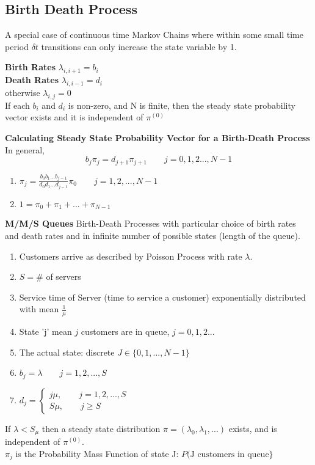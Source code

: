 \documentclass[10pt,a4paper]{article}
\begin{document}
\subsection{Birth Death Process}
A special case of continuous time Markov Chains where within some small time period $\delta t$ transitions can only increase the state variable by 1.
\begin{framed}
	\centering\textbf{Birth Rates}
	$\lambda_{i,i+1}=b_{i}$\\
	\centering\textbf{Death Rates}
	$\lambda_{i,i-1}=d_{i}$ \\
	otherwise $\lambda_{i,j} = 0$ \\
	If each $b_{i}$ and $d_{i}$ is non-zero, and N is finite, then the steady state probability vector exists and it is independent of $\pi^{(0)}$
	\end{framed}
	\newpage 
	\begin{framed}
		\centering\textbf{Calculating Steady State Probability Vector for a Birth-Death Process} \\ In general, 
		$$b_{j}\pi_{j} = d_{j+1}\pi_{j+1} \qquad j=0,1,2...,N-1$$ 
		\begin{enumerate}
		\item $\pi_{j} = \frac{b_{0}b_{1}...b_{j-1}}{d_{0}d_{1}...d_{j-1}}\pi_{0} \qquad j=1,2,...,N-1$
		\item $1 = \pi_{0} + \pi_{1} + ... + \pi_{N-1}$ 
		\end{enumerate}
\end{framed}
\begin{framed}
	\centering\textbf{M/M/S Queues}
	Birth-Death Processes with particular choice of birth rates and death rates and in infinite number of possible states (length of the queue).
	\begin{enumerate}
	\item Customers arrive as described by Poisson Process with rate $\lambda$.
	\item $S = \#$ of servers
	\item Service time of Server (time to service a customer) exponentially distributed with mean $\frac{1}{\mu}$
	\item State 'j' mean $j$ customers are in queue, $j = 0,1,2...$
	\item The actual state: discrete $J \in \{0,1,...,N-1\}$
	\item $b_{j}= \lambda \qquad j = 1,2,...,S$
	\item $d_{j} = \begin{cases}
	j\mu, \qquad j=1,2,...,S \\
	S\mu, \qquad j \geq S
	\end{cases}$
	\end{enumerate}
	If $\lambda < S_{\mu}$ then a steady state distribution $\pi = (\lambda_{0},\lambda_{1},...)$ exists, and is independent of $\pi^{(0)}$. \\ $\pi_{j}$ is the Probability Mass Function of state J: $P(\text{J customers in queue}\}$
\end{framed}
\end{document}
